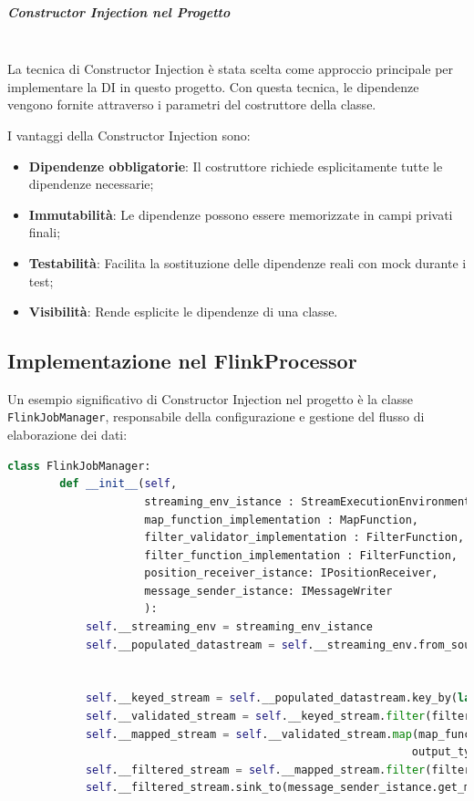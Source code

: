 \documentclass[10pt]{article}
\newcommand{\mysubparagraph}[1]{\subparagraph{#1}\mbox{}\\}
\begin{document}
    \mysubparagraph{Constructor Injection nel Progetto}
    
    La tecnica di Constructor Injection è stata scelta come approccio principale per implementare la DI in questo progetto. Con questa tecnica, le dipendenze vengono fornite attraverso i parametri del costruttore della classe.

    I vantaggi della Constructor Injection sono:
    \begin{itemize}
        \item \textbf{Dipendenze obbligatorie}: Il costruttore richiede esplicitamente tutte le dipendenze necessarie;
        \item \textbf{Immutabilità}: Le dipendenze possono essere memorizzate in campi privati finali;
        \item \textbf{Testabilità}: Facilita la sostituzione delle dipendenze reali con mock durante i test;
        \item \textbf{Visibilità}: Rende esplicite le dipendenze di una classe.
    \end{itemize}
    
    \subsection{Implementazione nel FlinkProcessor}
    
    Un esempio significativo di Constructor Injection nel progetto è la classe \texttt{FlinkJobManager}, responsabile della configurazione e gestione del flusso di elaborazione dei dati:
    
    \begin{lstlisting}[language=Python, caption=Esempio di Constructor Injection in FlinkJobManager]
    class FlinkJobManager:
        def __init__(self,
                     streaming_env_istance : StreamExecutionEnvironment,
                     map_function_implementation : MapFunction,
                     filter_validator_implementation : FilterFunction,
                     filter_function_implementation : FilterFunction,
                     position_receiver_istance: IPositionReceiver,
                     message_sender_istance: IMessageWriter
                     ):
            self.__streaming_env = streaming_env_istance
            self.__populated_datastream = self.__streaming_env.from_source(position_receiver_istance.get_position_receiver(),
                                                                       WatermarkStrategy.for_monotonous_timestamps(),
                                                                       "Positions Source")
            self.__keyed_stream = self.__populated_datastream.key_by(lambda x: x[0], key_type=Types.STRING())
            self.__validated_stream = self.__keyed_stream.filter(filter_validator_implementation)
            self.__mapped_stream = self.__validated_stream.map(map_function_implementation,
                                                              output_type=KafkaWriterConfiguration().row_type_info_message)
            self.__filtered_stream = self.__mapped_stream.filter(filter_function_implementation)
            self.__filtered_stream.sink_to(message_sender_istance.get_message_writer())
    \end{lstlisting}
    
\end{document}
